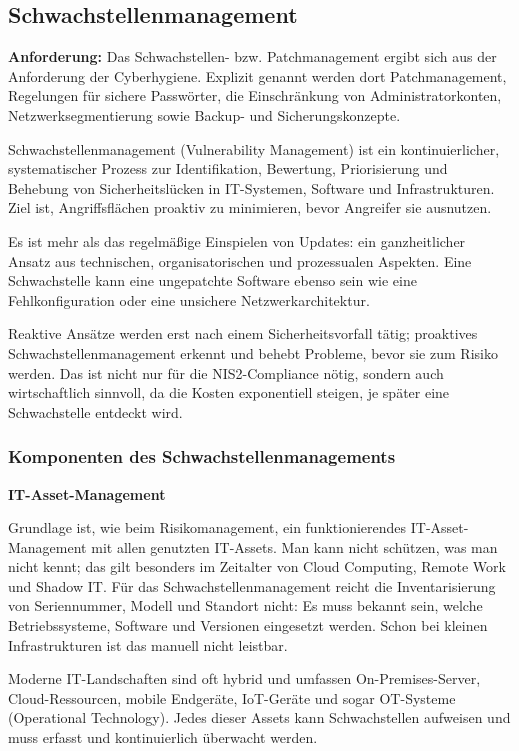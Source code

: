 \newpage
\subsection{Schwachstellenmanagement}

\textbf{Anforderung:} Das Schwachstellen- bzw. Patchmanagement ergibt sich aus der Anforderung der Cyberhygiene. Explizit genannt werden dort Patchmanagement, Regelungen für sichere Passwörter, die Einschränkung von Administratorkonten, Netzwerksegmentierung sowie Backup- und Sicherungskonzepte.

Schwachstellenmanagement (Vulnerability Management) ist ein kontinuierlicher, systematischer Prozess zur Identifikation, Bewertung, Priorisierung und Behebung von Sicherheitslücken in IT-Systemen, Software und Infrastrukturen. Ziel ist, Angriffsflächen proaktiv zu minimieren, bevor Angreifer sie ausnutzen.

Es ist mehr als das regelmäßige Einspielen von Updates: ein ganzheitlicher Ansatz aus technischen, organisatorischen und prozessualen Aspekten. Eine Schwachstelle kann eine ungepatchte Software ebenso sein wie eine Fehlkonfiguration oder eine unsichere Netzwerkarchitektur.

Reaktive Ansätze werden erst nach einem Sicherheitsvorfall tätig; proaktives Schwachstellenmanagement erkennt und behebt Probleme, bevor sie zum Risiko werden. Das ist nicht nur für die NIS2-Compliance nötig, sondern auch wirtschaftlich sinnvoll, da die Kosten exponentiell steigen, je später eine Schwachstelle entdeckt wird.

\subsubsection{Komponenten des Schwachstellenmanagements}

\textbf{IT-Asset-Management}

Grundlage ist, wie beim Risikomanagement, ein funktionierendes IT-Asset-Management mit allen genutzten IT-Assets. Man kann nicht schützen, was man nicht kennt; das gilt besonders im Zeitalter von Cloud Computing, Remote Work und Shadow IT. Für das Schwachstellenmanagement reicht die Inventarisierung von Seriennummer, Modell und Standort nicht: Es muss bekannt sein, welche Betriebssysteme, Software und Versionen eingesetzt werden. Schon bei kleinen Infrastrukturen ist das manuell nicht leistbar.

Moderne IT-Landschaften sind oft hybrid und umfassen On-Premises-Server, Cloud-Ressourcen, mobile Endgeräte, IoT-Geräte und sogar OT-Systeme (Operational Technology). Jedes dieser Assets kann Schwachstellen aufweisen und muss erfasst und kontinuierlich überwacht werden.

